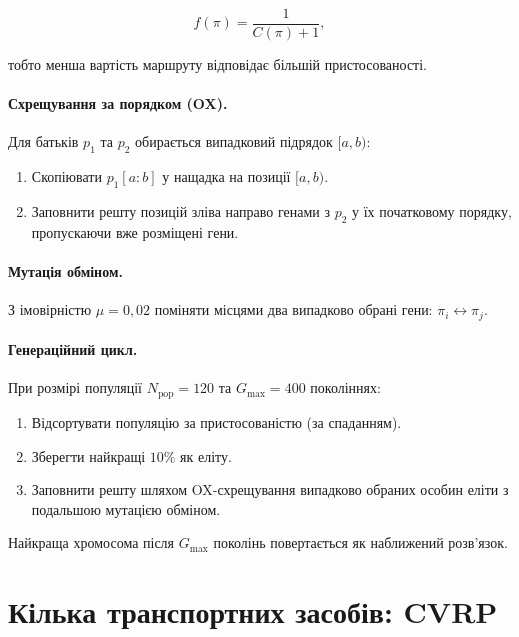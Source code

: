 \documentclass[12pt, a4paper]{article}
\theoremstyle{definition}
\begin{document}
\begin{equation}
  \label{eq:fitness}
  f(\pi) = \frac{1}{C(\pi) + 1},
\end{equation}

\noindent тобто менша вартість маршруту відповідає більшій пристосованості.

\paragraph{Схрещування за порядком (OX).}
Для батьків $p_1$ та $p_2$ обирається випадковий підрядок $[a, b)$:

\begin{enumerate}[noitemsep]
  \item Скопіювати $p_1[a:b]$ у нащадка на позиції $[a, b)$.
  \item Заповнити решту позицій зліва направо генами з $p_2$ у їх
        початковому порядку, пропускаючи вже розміщені гени.
\end{enumerate}

\paragraph{Мутація обміном.}
З імовірністю $\mu = 0{,}02$ поміняти місцями два випадково обрані гени:
$\pi_i \leftrightarrow \pi_j$.

\paragraph{Генераційний цикл.}
При розмірі популяції $N_{\text{pop}} = 120$ та $G_{\text{max}} = 400$
поколіннях:
\begin{enumerate}[noitemsep]
  \item Відсортувати популяцію за пристосованістю (за спаданням).
  \item Зберегти найкращі $10\%$ як еліту.
  \item Заповнити решту шляхом OX-схрещування випадково обраних особин еліти
        з подальшою мутацією обміном.
\end{enumerate}

Найкраща хромосома після $G_{\text{max}}$ поколінь повертається як
наближений розв'язок.

\section{Кілька транспортних засобів: CVRP}
\end{document}
